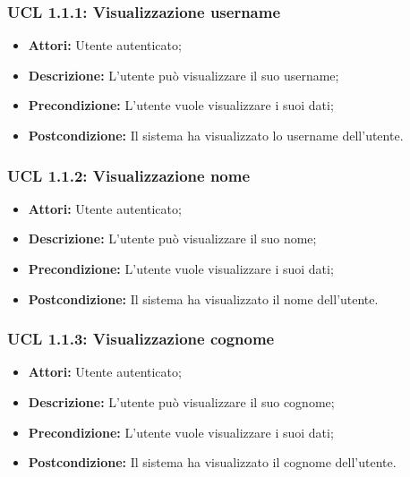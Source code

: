 \hypertarget{L1.1.1}{}
\subsubsection{UCL 1.1.1: Visualizzazione username}
\begin{itemize}
	\item \textbf{Attori:} Utente autenticato;
	\item \textbf{Descrizione:} L'utente può visualizzare il suo username;
	\item \textbf{Precondizione:} L'utente vuole visualizzare i suoi dati;
\item \textbf{Postcondizione:} Il sistema ha visualizzato lo username dell'utente.
\end{itemize}

\hypertarget{L1.1.2}{}
\subsubsection{UCL 1.1.2: Visualizzazione nome}
\begin{itemize}
	\item \textbf{Attori:} Utente autenticato;
	\item \textbf{Descrizione:} L'utente può visualizzare il suo nome;
	\item \textbf{Precondizione:} L'utente vuole visualizzare i suoi dati;
	\item \textbf{Postcondizione:} Il sistema ha visualizzato il nome dell'utente.
\end{itemize}

\hypertarget{L1.1.3}{}
\subsubsection{UCL 1.1.3: Visualizzazione cognome}
\begin{itemize}
	\item \textbf{Attori:} Utente autenticato;
	\item \textbf{Descrizione:} L'utente può visualizzare il suo cognome;
	\item \textbf{Precondizione:} L'utente vuole visualizzare i suoi dati;
	\item \textbf{Postcondizione:} Il sistema ha visualizzato il cognome dell'utente.
\end{itemize}

